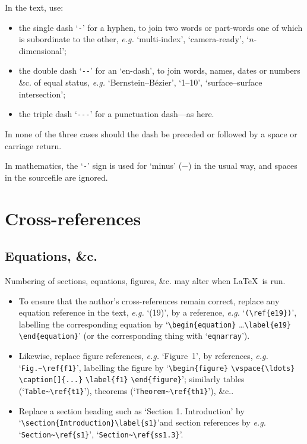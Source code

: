 In the text, use:
\begin{itemize}
\item the single dash `\verb!-!' for a hyphen, to join two words or
part-words one of which is subordinate to the other, {\em e.g.}
`multi-index', `camera-ready', `$n$-dimensional';
 
\item the double dash `\verb!--!' for an `en-dash', to join words, names,
dates or numbers \&c. of equal status, {\em e.g.} `Bernstein--B\'ezier',
`1--10', `surface--surface intersection';
 
\item the triple dash `\verb!---!' for a punctuation dash---as here.
\end{itemize}
In none of the three cases should the dash be preceded or followed by a
space or carriage return.
 
In mathematics, the `\verb!-!' sign is used for `minus' ($-$) in  the usual
way, and spaces in the sourcefile are ignored.
 
\section{Cross-references} \label{s5}
 
\subsection{Equations, \&c.}
 
Numbering of sections, equations, figures, \&c. may alter when \LaTeX\ is
run.
 
\begin{itemize}
 
\item To ensure that the author's cross-references remain correct, replace
any equation reference in the text, {\em e.g.} `(19)', by a reference, {\em
e.g.} `\verb!(\ref{e19})!', labelling the corresponding equation by
`\verb!\begin{equation}! \ldots \verb!\label{e19}! \verb!\end{equation}!'
(or the corresponding thing with `\verb!eqnarray!').
 
\item Likewise, replace figure references, {\em e.g.} `Figure~1', by
references, {\em e.g.} `\verb!Fig.~\ref{f1}!', labelling the figure by
`\verb!\begin{figure}! \verb!\vspace{\ldots}! \verb!\caption[]{...}!
\verb!\label{f1}! \verb!\end{figure}!'; similarly tables
(`\verb!Table~\ref{t1}!'), theorems (`\verb!Theorem~\ref{th1}!'), \&c..
 
\item Replace  a section heading such as `Section 1. Introduction' by
`\verb!\section{Introduction}\label{s1}!'and section references by {\em
e.g.} `\verb!Section~\ref{s1}!', `\verb!Section~\ref{ss1.3}!'.
 
\end{itemize}
 

